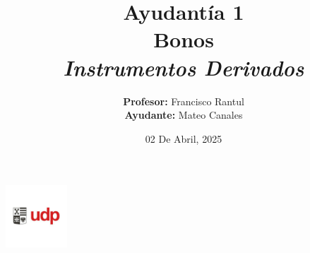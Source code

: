 \documentclass{beamer}
\title{Ayudantía 1 \\ Bonos \\ \large\textit{Instrumentos Derivados}}
\author{
  \texorpdfstring{
    \textbf{Profesor:} Francisco Rantul \\[0.3em]
    \textbf{Ayudante:} Mateo Canales
  }{Profesor: Francisco Rantul, Ayudante: Mateo Canales}
}
\institute{Universidad Diego Portales}
\date{02 De Abril, 2025}
\begin{document}
\begin{frame}
    \titlepage
    \vfill
    \centering
    \includegraphics[width=2.3118cm]{../imagenes/logo.png}
  \end{frame}
%
\newcommand{\Nominal}{100}    %
\newcommand{\Fseis}{94}     %
\newcommand{\Funo}{89}      %

\newcommand{\PunoCinco}{94.84}  %
\newcommand{\Pdos}{97.12}       %

\newcommand{\CunoCinco}{4}  %
\newcommand{\Cdos}{5}       %

\newcommand{\Tseis}{0.5}
\newcommand{\Tuno}{1.0}
\newcommand{\TunoCinco}{1.5}
\newcommand{\Tdos}{2.0}

\newcommand{\Ffinal}{104}
\newcommand{\FfinalDos}{105}
\newcommand{\taunio}{11.7\%}
\newcommand{\taaunoCinco}{11.2\%}
\newcommand{\tados}{10.9\%}

\newcommand{\rtaseis}{0.124}
\newcommand{\rtaunio}{0.117}
\newcommand{\rtaaunoCinco}{0.112}
\newcommand{\rtados}{0.109}

\end{document}
